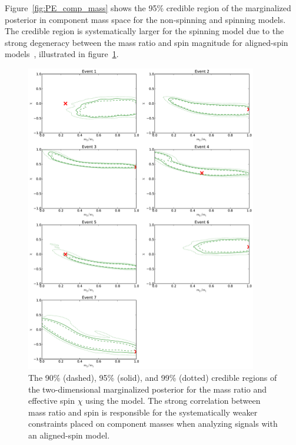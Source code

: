 Figure~\ref{fig:PE_comp_mass} shows the 95\% credible region of the
marginalized posterior in component mass space for the non-spinning and
spinning models.  The credible region is systematically larger for the spinning
model due to the strong degeneracy between the mass ratio and spin magnitude
for aligned-spin models~\cite{Baird:2012cu,Hannam:2013uu}, illustrated in
figure~\ref{fig:PE_q_chi}.

\begin{figure}[t]
  \includegraphics[width=0.9\textwidth]{papers/mdc2013_submission/figure7} 
  \caption{\label{fig:PE_q_chi} The 90\% (dashed), 95\% (solid), and 99\%
      (dotted) credible regions of the two-dimensional marginalized posterior
      for the mass ratio and effective spin $\chi$ using the \imr model.  The
      strong correlation between mass ratio and spin is responsible for the
      systematically weaker constraints placed on component masses when
      analyzing signals with an aligned-spin model.}
\end{figure} 


